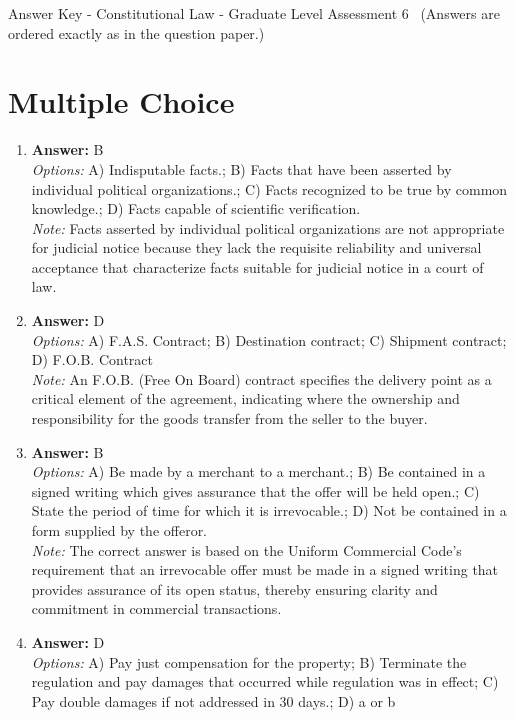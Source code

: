 \documentclass[12pt]{article}
\begin{document}
\begin{center}
Answer Key - Constitutional Law - Graduate Level Assessment 6 \
\small (Answers are ordered exactly as in the question paper.)
\end{center}

\section*{Multiple Choice}
\begin{enumerate}[label=\arabic*.]
\item \textbf{Answer:} B
\\ \textit{Options:} A) Indisputable facts.; B) Facts that have been asserted by individual political organizations.; C) Facts recognized to be true by common knowledge.; D) Facts capable of scientific verification.
\\ \textit{Note:} Facts asserted by individual political organizations are not appropriate for judicial notice because they lack the requisite reliability and universal acceptance that characterize facts suitable for judicial notice in a court of law.
\item \textbf{Answer:} D
\\ \textit{Options:} A) F.A.S. Contract; B) Destination contract; C) Shipment contract; D) F.O.B. Contract
\\ \textit{Note:} An F.O.B. (Free On Board) contract specifies the delivery point as a critical element of the agreement, indicating where the ownership and responsibility for the goods transfer from the seller to the buyer.
\item \textbf{Answer:} B
\\ \textit{Options:} A) Be made by a merchant to a merchant.; B) Be contained in a signed writing which gives assurance that the offer will be held open.; C) State the period of time for which it is irrevocable.; D) Not be contained in a form supplied by the offeror.
\\ \textit{Note:} The correct answer is based on the Uniform Commercial Code's requirement that an irrevocable offer must be made in a signed writing that provides assurance of its open status, thereby ensuring clarity and commitment in commercial transactions.
\item \textbf{Answer:} D
\\ \textit{Options:} A) Pay just compensation for the property; B) Terminate the regulation and pay damages that occurred while regulation was in effect; C) Pay double damages if not addressed in 30 days.; D) a or b

\end{enumerate}
\end{document}
